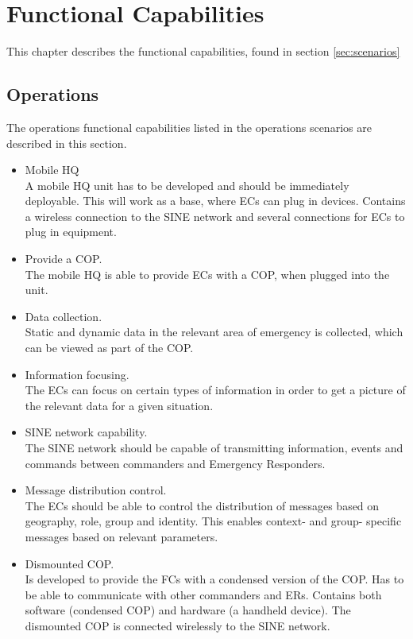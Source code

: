 \chapter{Functional Capabilities}
\label{chp_capabilities}
This chapter describes the functional capabilities, found in section \ref{sec:scenarios}

\section{Operations}
The operations functional capabilities listed in the operations scenarios are described in this section.
\begin{itemize}
	\item Mobile HQ\\
	A mobile HQ unit has to be developed and should be immediately deployable. This will work as a base, where ECs can plug in devices. Contains a wireless connection to the SINE network and several connections for ECs to plug in equipment. 
	\item Provide a COP.\\
	The mobile HQ is able to provide ECs with a COP, when plugged into the unit.
	\item Data collection.\\
	Static and dynamic data in the relevant area of emergency is collected, which can be viewed as part of the COP.
	\item Information focusing.\\
	The ECs can focus on certain types of information in order to get a picture of the relevant data for a given situation.
	\item SINE network capability.\\
	The SINE network should be capable of transmitting information, events and commands between commanders and Emergency Responders.
	\item Message distribution control. \\
	The ECs should be able to control the distribution of messages based on geography, role, group and identity. This enables context- and group- specific messages based on relevant parameters.
	\item Dismounted COP. \\
	Is developed to provide the FCs with a condensed version of the COP. Has to be able to communicate with other commanders and ERs. Contains both software (condensed COP) and hardware (a handheld device). The dismounted COP is connected wirelessly to the SINE network.
\end{itemize}

